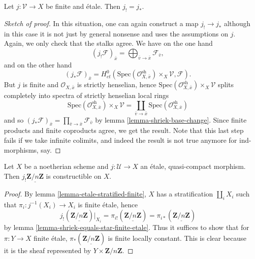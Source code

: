 \begin{lemma}
\label{lemma-shriek-equals-star-finite-etale}
Let $j: \mathcal{V}\to X$ be finite and \'etale. Then $j_! = j_*$.
\end{lemma}

\begin{proof}[Sketch of proof]
In this situation, one can again construct a map $j_! \to j_*$ although in this
case it is not just by general nonsense and uses the assumptions on $j$. Again,
we only check that the stalks agree. We have on the one hand
$$
(j_!\mathcal{F})_{\bar x} =
\bigoplus_{\bar v \to \bar x} \mathcal{F}_{\bar v},
$$
and on the other hand
$$
\left(j_* \mathcal{F} \right)_{\bar x} = H_{et}^0(\text{Spec}(\mathcal{O}_{X,
\bar x}^\text{sh})\times_X \mathcal{V}, \mathcal{F}).
$$
But $j$ is finite and $\mathcal{O}_{X, \bar x}$ is strictly henselian, hence
$\text{Spec}(\mathcal{O}_{X, \bar x}^\text{sh})\times_X \mathcal{V}$ splits
completely into spectra of strictly henselian local rings
$$
\text{Spec}(\mathcal{O}_{X, \bar x}^\text{sh})\times_X \mathcal{V} =
\coprod_{\bar v \to \bar x} \text{Spec}(\mathcal{O}_{X, \bar x}^\text{sh})
$$
and so $\left(j_* \mathcal{F} \right)_{\bar x} = \prod_{\bar v \to \bar
x} \mathcal{F}_{\bar v}$ by lemma \ref{lemma-shriek-base-change}. Since
finite products and finite coproducts agree, we get the result. Note that this
last step fails if we take infinite colimits, and indeed the result is not true
anymore for ind-morphisms, say.
\end{proof}

\begin{lemma}
\label{lemma-jshriek-constructible}
Let $X$ be a noetherian scheme and $j: \mathcal{U} \to X$ an \'etale,
quasi-compact morphism. Then $j_!\underline{\mathbf{Z}/n\mathbf{Z}}$ is
constructible on $X$.
\end{lemma}

\begin{proof}
By lemma \ref{lemma-etale-stratified-finite}, $X$ has a stratification
$\coprod_i X_i$ such that $\pi_i: j^{-1}(X_i)\to X_i$ is finite \'etale, hence
$$
j_!(\underline{\mathbf{Z}/n\mathbf{Z}})|_{X_i} =
\pi_{i!}(\underline{\mathbf{Z}/n\mathbf{Z}}) =
\pi_{i*}(\underline{\mathbf{Z}/n\mathbf{Z}})
$$
by lemma \ref{lemma-shriek-equals-star-finite-etale}. Thus it suffices to show
that for $\pi: Y\to X$ finite \'etale,
$\pi_*(\underline{\mathbf{Z}/n\mathbf{Z}})$ is finite locally constant. This is
clear because it is the sheaf represented by $Y\times \mathbf{Z}/n\mathbf{Z}$.
\end{proof}

